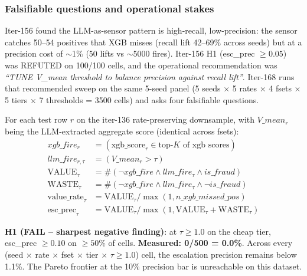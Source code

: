 
\subsubsection{Falsifiable questions and operational stakes}
Iter-156 found the LLM-as-sensor pattern is high-recall, low-precision:
the sensor catches 50--54 positives that XGB misses (recall lift
42--69\% across seeds) but at a precision cost of $\sim$1\% (50 lifts
vs $\sim$5000 fires). Iter-156 H1 (esc\_prec $\geq 0.05$) was REFUTED
on 100/100 cells, and the operational recommendation was
\emph{``TUNE V\_mean threshold to balance precision against recall
lift''}. Iter-168 runs that recommended sweep on the same 5-seed panel
(5 seeds $\times$ 5 rates $\times$ 4 fsets $\times$ 5 tiers $\times$
7 thresholds = 3500 cells) and asks four falsifiable questions.

For each test row $r$ on the iter-136 rate-preserving downsample, with
$V\_mean_r$ being the LLM-extracted aggregate score (identical across
fsets):
\begin{align*}
xgb\_fire_r &= (\text{xgb\_score}_r \in \text{top-}K\text{ of xgb scores}) \\
llm\_fire_{r,\tau} &= (V\_mean_r > \tau) \\
\text{VALUE}_\tau &= \#(\neg xgb\_fire \wedge llm\_fire_{\tau} \wedge is\_fraud) \\
\text{WASTE}_\tau &= \#(\neg xgb\_fire \wedge llm\_fire_{\tau} \wedge \neg is\_fraud) \\
\text{value\_rate}_\tau &= \text{VALUE}_\tau / \max(1, n\_xgb\_missed\_pos) \\
\text{esc\_prec}_\tau &= \text{VALUE}_\tau / \max(1, \text{VALUE}_\tau + \text{WASTE}_\tau)
\end{align*}

\textbf{H1 (FAIL -- sharpest negative finding)}: at $\tau \geq 1.0$ on
the cheap tier, esc\_prec $\geq 0.10$ on $\geq 50\%$ of cells.
\textbf{Measured: 0/500 = 0.0\%}. Across every (seed $\times$ rate
$\times$ fset $\times$ tier $\times$ $\tau \geq 1.0$) cell, the
escalation precision remains below 1.1\%. The Pareto frontier at the
10\% precision bar is unreachable on this dataset.

